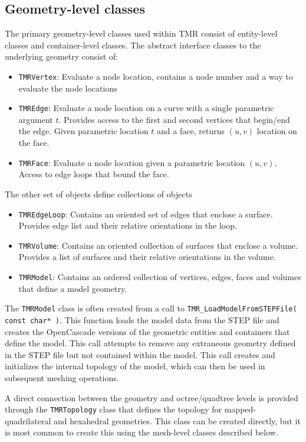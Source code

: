 \documentclass[12pt]{article}
\begin{document}
\subsection{Geometry-level classes}

The primary geometry-level classes used within TMR consist of entity-level classes and container-level classes. The abstract interface classes to the underlying geometry consist of:
\begin{itemize}
\item \texttt{TMRVertex}: Evaluate a node location, contains a node number and a way to evaluate the node locations
\item \texttt{TMREdge}: Evaluate a node location on a curve with a single parametric argument $t$. Provides access to the first and second vertices that begin/end the edge. Given parametric location $t$ and a face, returns $(u,v)$ location on the face.
\item \texttt{TMRFace}: Evaluate a node location given a parametric location $(u,v)$. Access to edge loops that bound the face.
\end{itemize}

The other set of objects define collections of objects
%
\begin{itemize}
\item \texttt{TMREdgeLoop}: Contains an oriented set of edges that enclose a surface. Provides edge list and their relative orientations in the loop.
\item \texttt{TMRVolume}: Contains an oriented collection of surfaces that enclose a volume. Provides a list of surfaces and their relative orientations in the volume.
\item \texttt{TMRModel}: Contains an ordered collection of vertices, edges, faces and volumes that define a model geometry.
\end{itemize}

The \texttt{TMRModel} class is often created from a call to \texttt{TMR\_LoadModelFromSTEPFile( const char* )}. 
This function loads the model data from the STEP file and creates the OpenCascade versions of the geometric entities and containers that define the model.
This call attempts to remove any extraneous geometry defined in the STEP file but not contained within the model.
This call creates and initializes the internal topology of the model, which can then be used in subsequent meshing operations.

A direct connection between the geometry and octree/quadtree levels is provided through the \texttt{TMRTopology} class that defines the topology for mapped-quadrilateral and hexahedral geometries. 
This class can be created directly, but it is most common to create this using the mesh-level classes described below.
\end{document}
